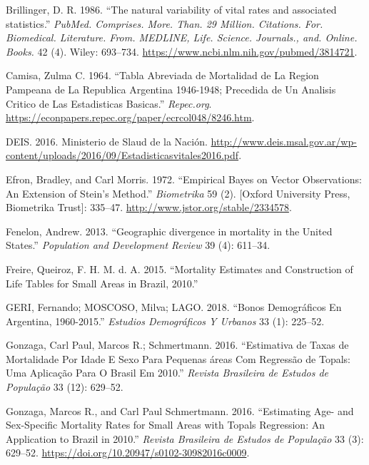 \documentclass[12pt,]{article}
\begin{document}
\leavevmode\hypertarget{ref-Brillinger1986}{}%
Brillinger, D. R. 1986. ``The natural variability of vital rates and
associated statistics.'' \emph{PubMed. Comprises. More. Than. 29
Million. Citations. For. Biomedical. Literature. From. MEDLINE, Life.
Science. Journals., and. Online. Books.} 42 (4). Wiley: 693--734.
\url{https://www.ncbi.nlm.nih.gov/pubmed/3814721}.

\leavevmode\hypertarget{ref-Camisa1964}{}%
Camisa, Zulma C. 1964. ``Tabla Abreviada de Mortalidad de La Region
Pampeana de La Republica Argentina 1946-1948; Precedida de Un Analisis
Critico de Las Estadisticas Basicas.'' \emph{Repec.org}.
\url{https://econpapers.repec.org/paper/ecrcol048/8246.htm}.

\leavevmode\hypertarget{ref-DEIS2016}{}%
DEIS. 2016. Ministerio de Slaud de la Nación.
\url{http://www.deis.msal.gov.ar/wp-content/uploads/2016/09/Estadisticasvitales2016.pdf}.

\leavevmode\hypertarget{ref-Efron1972}{}%
Efron, Bradley, and Carl Morris. 1972. ``Empirical Bayes on Vector
Observations: An Extension of Stein's Method.'' \emph{Biometrika} 59
(2). {[}Oxford University Press, Biometrika Trust{]}: 335--47.
\url{http://www.jstor.org/stable/2334578}.

\leavevmode\hypertarget{ref-Fenelon2013}{}%
Fenelon, Andrew. 2013. ``Geographic divergence in mortality in the
United States.'' \emph{Population and Development Review} 39 (4):
611--34.

\leavevmode\hypertarget{ref-FreireEtAl2015}{}%
Freire, Queiroz, F. H. M. d. A. 2015. ``Mortality Estimates and
Construction of Life Tables for Small Areas in Brazil, 2010.''

\leavevmode\hypertarget{ref-GeriMoscoso2018}{}%
GERI, Fernando; MOSCOSO, Milva; LAGO. 2018. ``Bonos Demográficos En
Argentina, 1960-2015.'' \emph{Estudios Demográficos Y Urbanos} 33 (1):
225--52.

\leavevmode\hypertarget{ref-GonzagaSchmertmann2016}{}%
Gonzaga, Carl Paul, Marcos R.; Schmertmann. 2016. ``Estimativa de Taxas
de Mortalidade Por Idade E Sexo Para Pequenas áreas Com Regressão de
Topals: Uma Aplicação Para O Brasil Em 2010.'' \emph{Revista Brasileira
de Estudos de População} 33 (12): 629--52.

\leavevmode\hypertarget{ref-Gonzaga_Schmertmann_2016}{}%
Gonzaga, Marcos R., and Carl Paul Schmertmann. 2016. ``Estimating Age-
and Sex-Specific Mortality Rates for Small Areas with Topals Regression:
An Application to Brazil in 2010.'' \emph{Revista Brasileira de Estudos
de População} 33 (3): 629--52.
\url{https://doi.org/10.20947/s0102-30982016c0009}.
\end{document}
